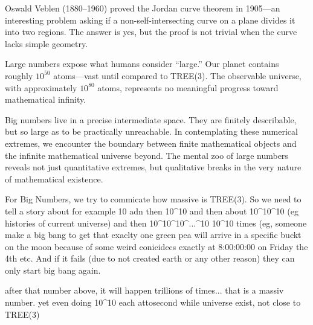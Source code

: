 Oswald Veblen (1880–1960) proved the Jordan curve theorem in 1905—an interesting problem asking if a non-self-intersecting curve on a plane divides it into two regions. The answer is yes, but the proof is not trivial when the curve lacks simple geometry.

Large numbers expose what humans consider ``large.'' Our planet contains roughly $10^{50}$ atoms—vast until compared to TREE(3). The observable universe, with approximately $10^{80}$ atoms, represents no meaningful progress toward mathematical infinity.

Big numbers live in a precise intermediate space. They are finitely describable, but so large as to be practically unreachable. In contemplating these numerical extremes, we encounter the boundary between finite mathematical objects and the infinite mathematical universe beyond. The mental zoo of large numbers reveals not just quantitative extremes, but qualitative breaks in the very nature of mathematical existence.




For Big Numbers, we try to commicate how massive is TREE(3). So we need to tell a story about for example 10 adn then 10^10 and then about 10^10^10 (eg histories of current universe) and then 10^10^10^...^10 10^10 times (eg, someone make a big bang to get that exaclty one green pea will arrive in a specific buckt on the moon because of some weird conicidecs exactly at 8:00:00:00 on Friday the 4th etc. And if it fails (due to not created earth or any other reason) they can only start big bang again. 

after that number above, it will happen trillions of times... that is a massiv number. yet even doing 10^10 each attosecond while universe exist, not close to TREE(3)